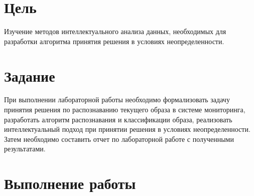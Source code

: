 \documentclass[a4paper, 12pt]{article}
\begin{document}

\pagebreak
\tableofcontents
\newpage
\section*{Цель}
Изучение методов интеллектуального анализа данных, необходимых для разработки алгоритма принятия решения в условиях неопределенности.
\section*{Задание}
При выполнении лабораторной работы необходимо формализовать задачу принятия решения по распознаванию текущего образа в системе мониторинга, разработать алгоритм распознавания и классификации образа, реализовать интеллектуальный подход при принятии решения в условиях неопределенности. Затем необходимо составить отчет по лабораторной работе с полученными результатами.
\newpage
\section{Выполнение работы}
\end{document}
